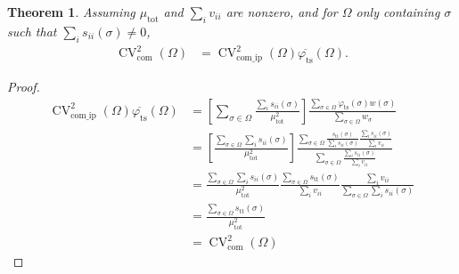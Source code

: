 \documentclass[letterpaper,11pt]{article}
\newcommand{\CV}{{\operatorname{CV}}}
\newcommand{\com}{{\operatorname{com}}}
\newcommand{\comip}{{\operatorname{com\_ip}}}
\newtheorem{theorem}{Theorem}[]
\begin{document}
\begin{theorem}\label{thm:range}
Assuming $\mu_{\text{tot}}$ and $\sum_i v_{ii}$ are nonzero, and for $\Omega$ only 
containing $\sigma$ such that $\sum_i s_{ii}(\sigma) \neq 0$,
\begin{align}
\CV_{\com}^2(\Omega) &= \CV_{\comip}^2(\Omega)  \overline{\varphi_{\text{ts}}}(\Omega) . \label{eq:the3eq1}
\end{align}
\end{theorem}
\begin{proof}
\begin{align}
\CV_{\comip}^2(\Omega)  \overline{\varphi_{\text{ts}}}(\Omega) 
&= \left[ \sum_{\sigma \in \Omega} \frac{\sum_i s_{ii}(\sigma)}{\mu_{\text{tot}}^2} \right]  \frac{\sum_{\sigma \in \Omega} \varphi_{\text{ts}}(\sigma) w(\sigma)}{\sum_{\sigma \in \Omega} w_{\sigma}}  \\
&= \left[ \frac{\sum_{\sigma \in \Omega} \sum_i s_{ii}(\sigma)}{\mu_{\text{tot}}^2} \right] \frac{\sum_{\sigma \in \Omega} \frac{s_{\text{tt}}(\sigma)}{\sum_i s_{ii}(\sigma)} \frac{\sum_i s_{ii}(\sigma)}{\sum_i v_{ii}}}{\sum_{\sigma \in \Omega} \frac{\sum_i s_{ii}(\sigma)}{\sum_i v_{ii}}} \\
&= \frac{\sum_{\sigma \in \Omega} \sum_i s_{ii}(\sigma)}{\mu_{\text{tot}}^2} \frac{\sum_{\sigma \in \Omega} s_{\text{tt}}(\sigma)}{\sum_i v_{ii}} \frac{\sum_i v_{ii}}{\sum_{\sigma \in \Omega} \sum_i s_{ii}(\sigma)} \\
&= \frac{\sum_{\sigma \in \Omega} s_{\text{tt}}(\sigma)}{\mu_{\text{tot}}^2} \\
&= \CV_{\com}^2(\Omega)
\end{align}
\end{proof}
\end{document}
